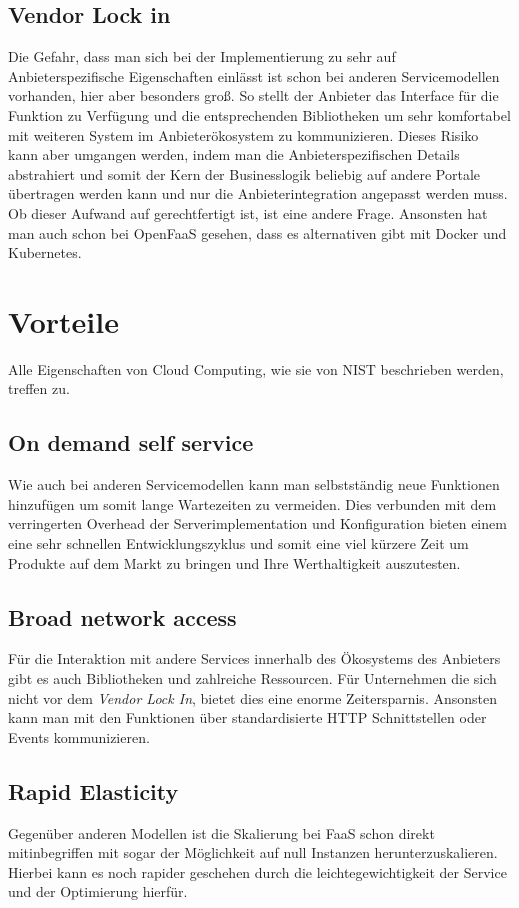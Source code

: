 \documentclass[12pt, a4paper]{article}
\begin{document}
\subsection{Vendor Lock in}
Die Gefahr, dass man sich bei der Implementierung zu sehr auf Anbieterspezifische Eigenschaften einlässt ist schon bei anderen Servicemodellen vorhanden, hier aber besonders groß.
So stellt der Anbieter das Interface für die Funktion zu Verfügung und die entsprechenden Bibliotheken um sehr komfortabel mit weiteren System im Anbieterökosystem zu kommunizieren.
Dieses Risiko kann aber umgangen werden, indem man die Anbieterspezifischen Details abstrahiert und somit der Kern der Businesslogik beliebig auf andere Portale übertragen werden kann und nur die Anbieterintegration angepasst werden muss.
Ob dieser Aufwand auf gerechtfertigt ist, ist eine andere Frage.
Ansonsten hat man auch schon bei OpenFaaS gesehen, dass es alternativen gibt mit Docker und Kubernetes.

\section{Vorteile}
Alle Eigenschaften von Cloud Computing, wie sie von \ac{NIST} beschrieben werden, treffen zu\cite{mell2011nist}.
\subsection{On demand self service}
Wie auch bei anderen Servicemodellen kann man selbstständig neue Funktionen hinzufügen um somit lange Wartezeiten zu vermeiden.
Dies verbunden mit dem verringerten Overhead der Serverimplementation und Konfiguration bieten einem eine sehr schnellen Entwicklungszyklus und somit eine viel kürzere Zeit um Produkte auf dem Markt zu bringen und Ihre Werthaltigkeit auszutesten.

\subsection{Broad network access}
Für die Interaktion mit andere Services innerhalb des Ökosystems des Anbieters gibt es auch Bibliotheken und zahlreiche Ressourcen.
Für Unternehmen die sich nicht vor dem \emph{Vendor Lock In}, bietet dies eine enorme Zeitersparnis.
Ansonsten kann man mit den Funktionen über standardisierte HTTP Schnittstellen oder Events kommunizieren.

\subsection{Rapid Elasticity}
Gegenüber anderen Modellen ist die Skalierung bei \ac{FaaS} schon direkt mitinbegriffen mit sogar der Möglichkeit auf null Instanzen herunterzuskalieren.
Hierbei kann es noch rapider geschehen durch die leichtegewichtigkeit der Service und der Optimierung hierfür.
\end{document}
